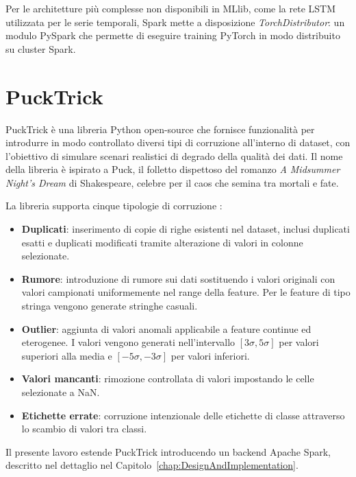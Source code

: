 \documentclass[../main.tex]{subfiles}
\begin{document}
Per le architetture più complesse non disponibili in MLlib, come la rete LSTM utilizzata per le serie temporali, Spark mette a disposizione \textit{TorchDistributor}: un modulo PySpark che permette di eseguire training PyTorch in modo distribuito su cluster Spark.

\section{PuckTrick}

PuckTrick è una libreria Python open-source che fornisce funzionalità per introdurre in modo controllato diversi tipi di corruzione all'interno di dataset, con l'obiettivo di simulare scenari realistici di degrado della qualità dei dati. Il nome della libreria è ispirato a Puck, il folletto dispettoso del romanzo \textit{A Midsummer Night's Dream} di Shakespeare, celebre per il caos che semina tra mortali e fate\cite{agostini2025pucktricklibrarymakingsynthetic}.

La libreria supporta cinque tipologie di corruzione  \cite{maurino2025data}:

\begin{itemize}
    \item \textbf{Duplicati}: inserimento di copie di righe esistenti nel dataset, inclusi duplicati esatti e duplicati modificati tramite alterazione di valori in colonne selezionate.
    
    \item \textbf{Rumore}: introduzione di rumore sui dati sostituendo i valori originali con valori campionati uniformemente nel range della feature. Per le feature di tipo stringa vengono generate stringhe casuali.
    
    \item \textbf{Outlier}: aggiunta di valori anomali applicabile a feature continue ed eterogenee. I valori vengono generati nell'intervallo $[3\sigma, 5\sigma]$ per valori superiori alla media e $[-5\sigma, -3\sigma]$ per valori inferiori.
    
    \item \textbf{Valori mancanti}: rimozione controllata di valori impostando le celle selezionate a NaN.
    
    \item \textbf{Etichette errate}: corruzione intenzionale delle etichette di classe attraverso lo scambio di valori tra classi.
\end{itemize}

Il presente lavoro estende PuckTrick introducendo un backend 
Apache Spark, descritto nel dettaglio nel 
Capitolo~\ref{chap:DesignAndImplementation}.
\end{document}
